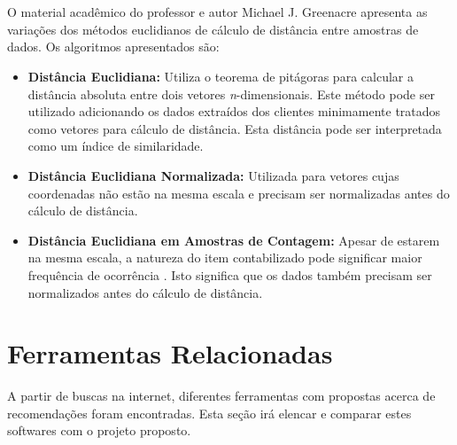 \documentclass[
	12pt,				%
    oneside,			%
	a4paper,			%
	english,			%
	french,				%
	spanish,			%
	brazil,				%
	]{abntex2}
\begin{document}
\section{}
O material acadêmico do professor e autor Michael J. Greenacre apresenta as variações dos métodos euclidianos de cálculo de distância entre amostras de dados. Os algoritmos apresentados são:

\begin{itemize}
	\item \textbf{Distância Euclidiana:} Utiliza o teorema de pitágoras para calcular a distância absoluta entre dois vetores \textit{n}-dimensionais. Este método pode ser utilizado adicionando os dados extraídos 
	dos clientes minimamente tratados como vetores para cálculo de distância. Esta distância pode ser interpretada como um índice de similaridade.
	\item \textbf{Distância Euclidiana Normalizada:} Utilizada para vetores cujas coordenadas não estão na mesma escala e precisam ser normalizadas antes do cálculo de distância. 
	\item \textbf{Distância Euclidiana em Amostras de Contagem:} Apesar de estarem na mesma escala, a natureza do item contabilizado pode significar maior frequência de ocorrência \cite{7-MeasuresBetweenSamples}. 
	Isto significa que os dados também precisam ser normalizados antes do cálculo de distância. 
\end{itemize}

\section{Ferramentas Relacionadas}
A partir de buscas na internet, diferentes ferramentas com propostas acerca de recomendações foram encontradas. Esta seção irá elencar e comparar estes softwares com o projeto proposto.
\end{document}
